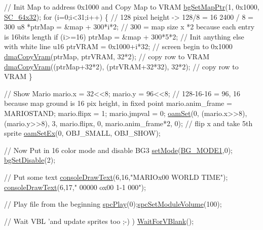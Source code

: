\begin{DoxyCodeInclude}
    \textcolor{comment}{// Init Map to address 0x1000 and Copy Map to VRAM}
    \hyperlink{a00287_a4fcbdb4b2378a64e8db62a184ee1851e}{bgSetMapPtr}(1, 0x1000, \hyperlink{a00287_a6129b86a7c2913a31f1bca293fa7c1e7}{SC\_64x32});
    \textcolor{keywordflow}{for} (i=0;i<31;i++) \{ \textcolor{comment}{// 128 pixel height -> 128/8 = 16 2400 / 8 = 300}
        u8 *ptrMap  = &map + 300*i*2; \textcolor{comment}{// 300 = map size x *2 because each entry is 16bits length}
        \textcolor{keywordflow}{if} (i>=16) ptrMap  = &map + 300*5*2; \textcolor{comment}{// Init anything else with white line}
        u16 ptrVRAM = 0x1000+i*32; \textcolor{comment}{// screen begin to 0x1000}
        \hyperlink{a00293_aaf545b3f811f6ef4b7c4be434701a77a}{dmaCopyVram}(ptrMap, ptrVRAM, 32*2); \textcolor{comment}{// copy row to VRAM }
        \hyperlink{a00293_aaf545b3f811f6ef4b7c4be434701a77a}{dmaCopyVram}((ptrMap+32*2), (ptrVRAM+32*32), 32*2); \textcolor{comment}{// copy row to VRAM }
    \}

    \textcolor{comment}{// Show Mario}
    mario.x = 32<<8; mario.y = 96<<8; \textcolor{comment}{// 128-16-16 = 96, 16 because map ground is 16 pix height, in fixed
       point}
    mario.anim\_frame = MARIOSTAND; mario.flipx = 1; mario.jmpval = 0;
    \hyperlink{a00320_a2f62a591672b786d90ebb03fdf25f159}{oamSet}(0,  (mario.x>>8), (mario.y>>8), 3, mario.flipx, 0, mario.anim\_frame*2, 0);  \textcolor{comment}{// flip x and
       take 5th sprite}
    \hyperlink{a00320_a4120a8ff32c39973babeca3615a0a2fd}{oamSetEx}(0, OBJ\_SMALL, OBJ\_SHOW);
    
    \textcolor{comment}{// Now Put in 16 color mode and disable BG3}
    \hyperlink{a00323_afd9e46ae627d055dd8c98a4b0ebb73b1}{setMode}(\hyperlink{a00287_a05c862edb7f8f75036f10c04dcc3c2a6}{BG\_MODE1},0);  \hyperlink{a00287_a4dbfb1b8854ff9ca4a7d11a899281bbb}{bgSetDisable}(2);
    
    \textcolor{comment}{// Put some text}
    \hyperlink{a00290_a7e52d15b5a1befa42f5758de19dfb70c}{consoleDrawText}(6,16,\textcolor{stringliteral}{"MARIOx00  WORLD TIME"});
    \hyperlink{a00290_a7e52d15b5a1befa42f5758de19dfb70c}{consoleDrawText}(6,17,\textcolor{stringliteral}{" 00000 ox00 1-1  000"});
    
    \textcolor{comment}{// Play file from the beginning}
    \hyperlink{a00317_aebf91de1df5e4fa83454a84bb0e60918}{spcPlay}(0);\hyperlink{a00317_ae2c8dfab62ceecf5c302c95f5453a752}{spcSetModuleVolume}(100);
    
    \textcolor{comment}{// Wait VBL 'and update sprites too ;-) )}
    \hyperlink{a00296_a815e2626bd26d0e936d507a363ecd723}{WaitForVBlank}();
    

\end{DoxyCodeInclude}

